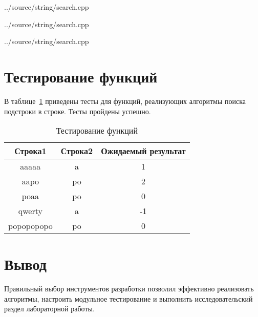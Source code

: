 \documentclass[a4paper,14pt]{extreport}
\begin{document}
\begin{lstinputlisting}[
	caption={Стандартный алгоритм},
	label={lst:standard},
	style={cpp},
	linerange={6-26}
	]{../source/string/search.cpp}
\end{lstinputlisting}

\begin{lstinputlisting}[
	caption={Алгоритм Кнута — Морриса — Пратта},
	label={lst:kmp},
	style={cpp},
	linerange={28-68}
	]{../source/string/search.cpp}
\end{lstinputlisting}

\begin{lstinputlisting}[
	caption={Алгоритм Бойера — Мура},
	label={lst:bm},
	style={cpp},
	linerange={70-112}
	]{../source/string/search.cpp}
\end{lstinputlisting}

\section{Тестирование функций}

В таблице~\ref{tbl:test} приведены тесты для функций, реализующих алгоритмы поиска подстроки в строке.
Тесты пройдены успешно.

\begin{table}[h!]
	\begin{center}
		\begin{tabular}{|c|c|c|}
			\hline
			\textbf{Строка1} & \textbf{Строка2} & \textbf{Ожидаемый результат} \\ \hline
			aaaaa      & a  & 1  \\ \hline
			aapo       & po & 2  \\ \hline
			poaa       & po & 0  \\ \hline
			qwerty     & a  & -1 \\ \hline
			popopopopo & po & 0  \\ \hline
		\end{tabular}
		\caption{Тестирование функций}
		\label{tbl:test}
	\end{center}
\end{table}

\section*{Вывод}

Правильный выбор инструментов разработки позволил эффективно реализовать алгоритмы, настроить модульное тестирование и выполнить исследовательский раздел лабораторной работы.
\end{document}
